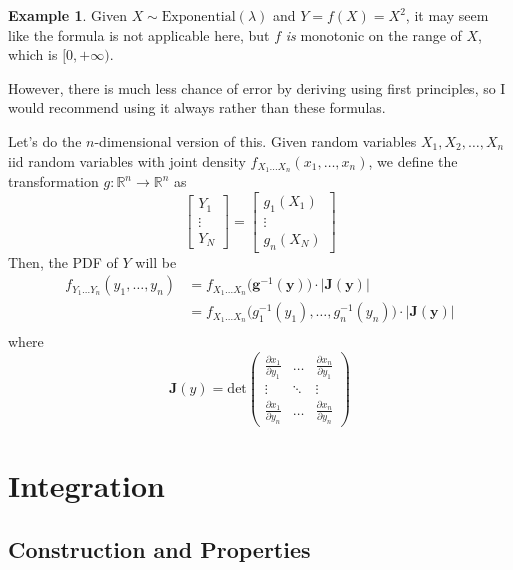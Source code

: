 \documentclass{article}
\theoremstyle{definition}
\newtheorem{example}{Example}[section]
\theoremstyle{remark}
\theoremstyle{definition}
\begin{document}
\begin{example}
Given $X \sim \mathrm{Exponential}(\lambda)$ and $Y = f(X) = X^2$, it may seem like the formula is not applicable here, but $f$ \textit{is} monotonic on the range of $X$, which is $[0, + \infty)$. 
\end{example}

However, there is much less chance of error by deriving using first principles, so I would recommend using it always rather than these formulas. 

Let's do the $n$-dimensional version of this. Given random variables $X_1, X_2, \ldots, X_n$ iid random variables with joint density $f_{X_1 \ldots X_n} (x_1, \ldots, x_n)$, we define the transformation $g: \mathbb{R}^n \rightarrow \mathbb{R}^n$ as 
\[\begin{bmatrix} Y_1 \\ \vdots \\ Y_N \end{bmatrix} = \begin{bmatrix} g_1 (X_1) \\ \vdots \\ g_n (X_N) \end{bmatrix}\]
Then, the PDF of $Y$ will be 
\begin{align*}
    f_{Y_1 \ldots Y_n} (y_1, \ldots, y_n) & = f_{X_1 \ldots X_n} \big( \mathbf{g}^{-1} (\mathbf{y}) \big) \cdot | \mathbf{J}(\mathbf{y})| \\
    & = f_{X_1 \ldots X_n} \big( g_1^{-1}(y_1), \ldots, g_n^{-1} (y_n) \big) \cdot | \mathbf{J}(\mathbf{y})| \\
\end{align*}
where 
\[\mathbf{J}(y) = \mathrm{det}\begin{pmatrix} 
\frac{\partial x_1}{\partial y_1} & \ldots & \frac{\partial x_n}{\partial y_1} \\
\vdots & \ddots & \vdots \\ 
\frac{\partial x_1}{\partial y_n} & \ldots & \frac{\partial x_n}{\partial y_n} \end{pmatrix}\]


\section{Integration}

\subsection{Construction and Properties}
\end{document}
